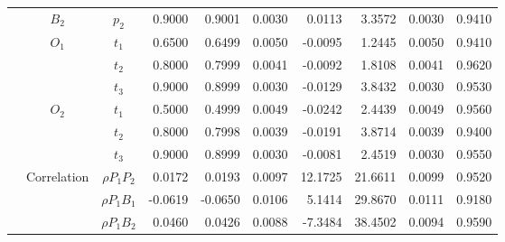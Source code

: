 \documentclass[letterpaper]{article}
\begin{document}
\begin{table}[h]
\begin{tabular}{cccrrrrrrr}
            & $B_2$       & $p_2$          & 0.9000                 & 0.9001                 & 0.0030                 & 0.0113                 & 3.3572                 & 0.0030                   & 0.9410                 \\
            & $O_1$       & $t_1$          & 0.6500                 & 0.6499                 & 0.0050                 & -0.0095                & 1.2445                 & 0.0050                   & 0.9410                 \\
            &             & $t_2$          & 0.8000                 & 0.7999                 & 0.0041                 & -0.0092                & 1.8108                 & 0.0041                   & 0.9620                 \\
            &             & $t_3$          & 0.9000                 & 0.8999                 & 0.0030                 & -0.0129                & 3.8432                 & 0.0030                   & 0.9530                 \\
            & $O_2$       & $t_1$          & 0.5000                 & 0.4999                 & 0.0049                 & -0.0242                & 2.4439                 & 0.0049                   & 0.9560                 \\
            &             & $t_2$          & 0.8000                 & 0.7998                 & 0.0039                 & -0.0191                & 3.8714                 & 0.0039                   & 0.9400                 \\
            &             & $t_3$          & 0.9000                 & 0.8999                 & 0.0030                 & -0.0081                & 2.4519                 & 0.0030                   & 0.9550                 \\
            & Correlation & $\rho{P_1P_2}$ & 0.0172                 & 0.0193                 & 0.0097                 & 12.1725                & 21.6611                & 0.0099                   & 0.9520                 \\
            &             & $\rho{P_1B_1}$ & -0.0619                & -0.0650                & 0.0106                 & 5.1414                 & 29.8670                & 0.0111                   & 0.9180                 \\
            &             & $\rho{P_1B_2}$ & 0.0460                 & 0.0426                 & 0.0088                 & -7.3484                & 38.4502                & 0.0094                   & 0.9590                 \\

\end{tabular}
\end{table}
\end{document}
